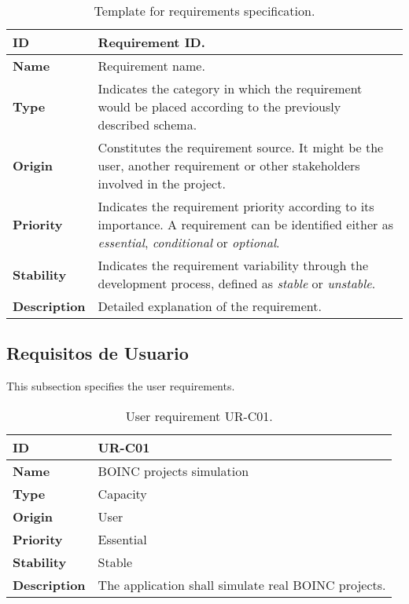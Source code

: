 \begin{center}
\begin{table*}[htbp]
\centering
\begin{tabular}{@{}p{2.5cm} p{9cm}@{}} 
\toprule
\textbf{ID} 				& Requirement ID. \\
\midrule
\textbf{Name} 			& Requirement name. \\
\midrule
\textbf{Type} 			& Indicates the category in which the requirement would be placed according to the previously described schema. \\
\midrule
\textbf{Origin} 			& Constitutes the requirement source. It might be the user, another requirement or other stakeholders involved in the project. \\
\midrule
\textbf{Priority}		& Indicates the requirement priority according to its importance. A requirement can be identified either as \textit{essential}, \textit{conditional} or \textit{optional}. \\
\midrule
\textbf{Stability} 		& Indicates the requirement variability through the development process, defined as \textit{stable} or \textit{unstable}. \\
\midrule
\textbf{Description} 	& Detailed explanation of the requirement. \\
\bottomrule
\end{tabular}
\caption{Template for requirements specification.}
\label{tab:requirements_template}
\end{table*}
\end{center}

\subsection{Requisitos de Usuario}

This subsection specifies the user requirements.

\begin{center}
\begin{table*}[htbp]
\centering
\begin{tabular}{@{}p{2.5cm} p{9cm}@{}} 
\toprule
\textbf{ID} 				& UR-C01\\
\midrule
\textbf{Name} 			& BOINC projects simulation \\
\midrule
\textbf{Type} 			& Capacity \\
\midrule
\textbf{Origin} 			& User \\
\midrule
\textbf{Priority}		& Essential \\
\midrule
\textbf{Stability} 		& Stable \\
\midrule
\textbf{Description} 	& The application shall simulate real BOINC projects. \\
\bottomrule
\end{tabular}
\caption{User requirement UR-C01.}
\label{tab:urc01}
\end{table*}
\end{center}


